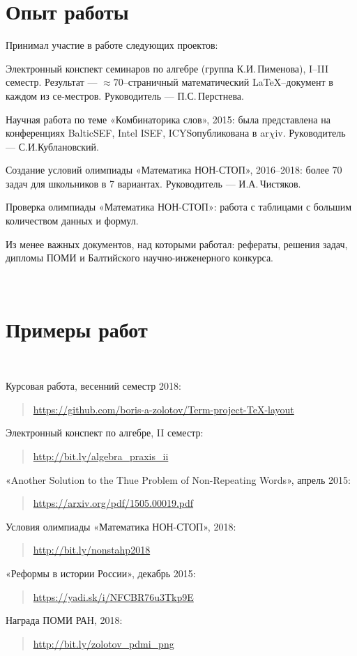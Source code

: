 \documentclass[11pt,a4paper]{article}
\def\sec#1{\section{#1} \vspace{-0.22cm}}
\begin{document}
\sec{Опыт работы}
\noindent Принимал участие в работе следующих проектов:\vspace{-0.18cm}
\begin{itemize}
\setlength\itemsep{0.2ex}

\ite Электронный конспект семинаров по алгебре (группа К.И.\,Пименова), I–III семестр. Результат — $\approx\!70$--страничный математический \LaTeX--документ в каждом из се-\linebreak местров. Руководитель — П.С.\,Перстнева.

\ite Научная работа по теме «Комбинаторика слов», 2015: была представлена на конференциях BalticSEF, Intel ISEF, ICYS\scolon опубликована в {\sffamily ar$\chi$iv}. Руководитель — С.И.\linebreak Кублановский.

\ite Создание условий олимпиады «Математика НОН-СТОП», 2016–2018: более 70 задач для школьников в 7 вариантах. Руководитель — И.А.\,Чистяков.

\ite Проверка олимпиады «Математика НОН-СТОП»: работа с таблицами с большим количеством данных и формул.
\end{itemize}

\noindent Из менее важных документов, над которыми работал: рефераты, решения задач, дипломы ПОМИ и Балтийского научно-инженерного конкурса.



\vfill\eject
\ \\
\sec{Примеры работ}
\ 
\begin{itemize}

\ite Курсовая работа, весенний семестр 2018:

\begin{quote}
\url{https://github.com/boris-a-zolotov/Term-project-TeX-layout}
\end{quote}

\ite Электронный конспект по алгебре, II семестр:

\begin{quote}
\url{http://bit.ly/algebra_praxis_ii}
\end{quote}

\ite «Another Solution to the Thue Problem of Non-Repeating Words», апрель 2015:

\begin{quote}
\url{https://arxiv.org/pdf/1505.00019.pdf}
\end{quote}

\ite Условия олимпиады «Математика НОН-СТОП», 2018:

\begin{quote}
\url{http://bit.ly/nonstahp2018}
\end{quote}

\ite «Реформы в истории России», декабрь 2015:

\begin{quote}
\url{https://yadi.sk/i/NFCBR76u3Tkp9E}
\end{quote}

\ite Награда ПОМИ РАН, 2018:

\begin{quote}
\url{http://bit.ly/zolotov_pdmi_png}
\end{quote}
\end{itemize}
\end{document}
